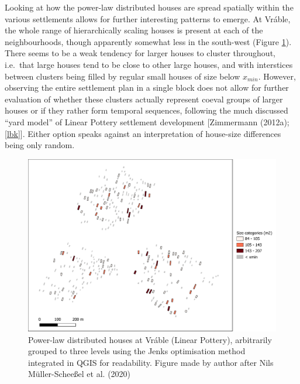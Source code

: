 \documentclass[
  12pt,
  a4paper, twoside]{book}
\begin{document}
Looking at how the power-law distributed houses are spread spatially within the various settlements allows for further interesting patterns to emerge. At Vráble, the whole range of hierarchically scaling houses is present at each of the neighbourhoods, though apparently somewhat less in the south-west (Figure \ref{fig:06-vrable-map}). There seems to be a weak tendency for larger houses to cluster throughout, i.e.~that large houses tend to be close to other large houses, and with interstices between clusters being filled by regular small houses of size below \(x_{min}\). However, observing the entire settlement plan in a single block does not allow for further evaluation of whether these clusters actually represent coeval groups of larger houses or if they rather form temporal sequences, following the much discussed ``yard model'' of Linear Pottery settlement development {[}Zimmermann (2012a); \ref{lbk}{]}. Either option speaks against an interpretation of house-size differences being only random.



\begin{figure}

{\centering \includegraphics[width=0.9\linewidth]{Results/fig06_vrable_pl} 

}

\caption[Settlement plan of Vráble with power-law houses]{Power-law distributed houses at Vráble (Linear Pottery), arbitrarily grouped to three levels using the Jenks optimisation method integrated in QGIS for readability. Figure made by author after Nils Müller-Scheeßel et al. (2020)}\label{fig:06-vrable-map}
\end{figure}
\end{document}
